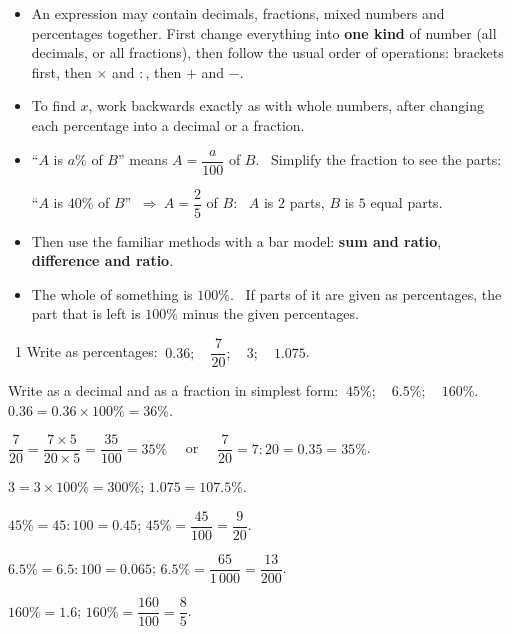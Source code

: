 \begin{knowbox}\begin{itemize}[leftmargin=1.4em,itemsep=3pt]
\item An expression may contain decimals, fractions, mixed numbers and percentages together. First change everything into \textbf{one kind} of number (all decimals, or all fractions), then follow the usual order of operations: brackets first, then $\times$ and $:$, then $+$ and $-$.
\item To find $x$, work backwards exactly as with whole numbers, after changing each percentage into a decimal or a fraction.
\end{itemize}
\end{knowbox}
\gap
{}
\begin{knowbox}\begin{itemize}[leftmargin=1.4em,itemsep=3pt]
\item ``$A$ is $a\%$ of $B$'' means $A=\dfrac a{100}$ of $B$. \ Simplify the fraction to see the parts:\par
``$A$ is $40\%$ of $B$'' $\ \Rightarrow\ A=\dfrac25$ of $B$: \ $A$ is $2$ parts, $B$ is $5$ equal parts.
\item Then use the familiar methods with a bar model: \textbf{sum and ratio}, \textbf{difference and ratio}.
\item The whole of something is $100\%$. \ If parts of it are given as percentages, the part that is left is $100\%$ minus the given percentages.
\end{itemize}
\end{knowbox}
\gap
\begin{exbox}{\ExWord\ 1}
 Write as percentages: $\ 0.36;\quad \dfrac7{20};\quad 3;\quad 1.075$.\par
{} Write as a decimal and as a fraction in simplest form: $\ 45\%;\quad 6.5\%;\quad 160\%$.
\guide
{} $0.36=0.36\times100\%=36\%$.\par
$\dfrac7{20}=\dfrac{7\times5}{20\times5}=\dfrac{35}{100}=35\%$ \ \ or \ \ $\dfrac7{20}=7:20=0.35=35\%$.\par
$3=3\times100\%=300\%$; \qquad $1.075=107.5\%$.\par
{} $45\%=45:100=0.45$; \quad $45\%=\dfrac{45}{100}=\dfrac9{20}$.\par
$6.5\%=6.5:100=0.065$; \quad $6.5\%=\dfrac{65}{1\,000}=\dfrac{13}{200}$.\par
$160\%=1.6$; \quad $160\%=\dfrac{160}{100}=\dfrac85$.
\end{exbox}
